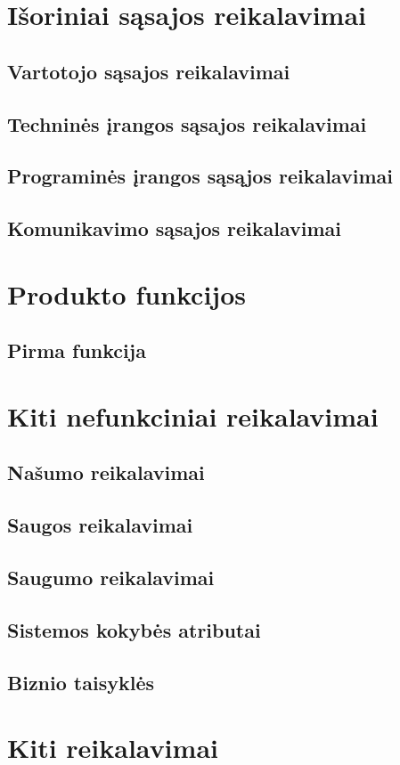 \documentclass[oneside]{VUMIFPSkursinis}
\begin{document}
\section{Išoriniai sąsajos reikalavimai}
\subsection{Vartotojo sąsajos reikalavimai}
\subsection{Techninės įrangos sąsajos reikalavimai}
\subsection{Programinės įrangos sąsąjos reikalavimai}
\subsection{Komunikavimo sąsajos reikalavimai}

\section{Produkto funkcijos}
\subsection{Pirma funkcija}

\section{Kiti nefunkciniai reikalavimai}
\subsection{Našumo reikalavimai}
\subsection{Saugos reikalavimai}
\subsection{Saugumo reikalavimai}
\subsection{Sistemos kokybės atributai}
\subsection{Biznio taisyklės}

\section{Kiti reikalavimai}
\end{document}

